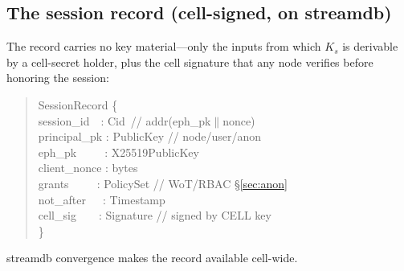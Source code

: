\documentclass[10pt,twocolumn]{article}
\newcommand{\Ks}{\ensuremath{K_s}}
\begin{document}
\subsection{The session record (cell-signed, on streamdb)}
The record carries no key material---only the inputs from which \Ks{} is derivable
by a cell-secret holder, plus the cell signature that any node verifies before
honoring the session:
\begin{quote}\scriptsize\ttfamily
SessionRecord \{\\
\hspace*{1.2em}session\_id\ \ : Cid\ // addr(eph\_pk\(\|\)nonce)\\
\hspace*{1.2em}principal\_pk : PublicKey // node/user/anon\\
\hspace*{1.2em}eph\_pk\ \ \ \ \ : X25519PublicKey\\
\hspace*{1.2em}client\_nonce : bytes\\
\hspace*{1.2em}grants\ \ \ \ \ : PolicySet // WoT/RBAC \S\ref{sec:anon}\\
\hspace*{1.2em}not\_after\ \ \ : Timestamp\\
\hspace*{1.2em}cell\_sig\ \ \ \ : Signature // signed by CELL key\\
\}
\end{quote}
streamdb convergence makes the record available cell-wide.
\end{document}

